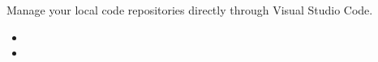 \begin{cvprojects}
  {Manage your local code repositories directly through Visual Studio Code.}
  {
    \begin{itemize}
      \item
      \item
    \end{itemize}
  }

\end{cvprojects}